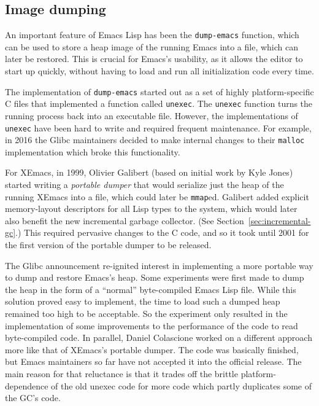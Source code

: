 \documentclass[format=acmsmall, review]{acmart}
\newcommand \Elisp {Emacs Lisp}
\begin{document}
\subsection{Image dumping}
\label{sec:image-dumping}

An important feature of \Elisp{} has been the \texttt{dump-emacs}
function, which can be used to store a heap image of the running Emacs
into a file, which can later be restored.  This is crucial for Emacs's
usability, as it allows the editor to start up quickly, without
having to load and run all initialization code every time.

The implementation of \texttt{dump-emacs} started out as a set of highly
platform-specific C files that implemented a function called
\texttt{unexec}.  The \texttt{unexec} function turns the running process
back into an executable file.  However, the implementations of
\texttt{unexec} have been hard to write and required frequent maintenance.
For example, in 2016 the Glibc maintainers decided to make internal changes
to their \texttt{malloc} implementation which broke this functionality.

For XEmacs, in 1999, Olivier Galibert (based on initial work by Kyle
Jones) started writing a \emph{portable dumper} that would serialize
just the heap of the running XEmacs into a file, which could later be
\texttt{mmap}ed.  Galibert added explicit memory-layout descriptors
for all Lisp types to the system, which would later also benefit the
new incremental garbage collector.  (See
Section~\ref{sec:incremental-gc}.)  This required pervasive changes to
the C code, and so it took until 2001 for the first version of the
portable dumper to be released.

The Glibc announcement re-ignited interest in implementing a more portable
way to dump and restore Emacs's heap.  Some experiments were first made to dump
the heap in the form of a ``normal'' byte-compiled \Elisp{} file.
While this solution proved easy to implement, the time to load such a dumped
heap remained too high to be acceptable.  So the experiment only resulted in
the implementation of some improvements to the performance of the code to
read byte-compiled code.  In parallel, Daniel Colascione worked on
a different approach more like that of XEmacs's portable dumper.  The code
was basically finished, but Emacs maintainers so far have not accepted it
into the official release.  The main reason for that reluctance is that it
trades off the brittle platform-dependence of the old unexec code for more
code which partly duplicates some of the GC's code.
\end{document}
